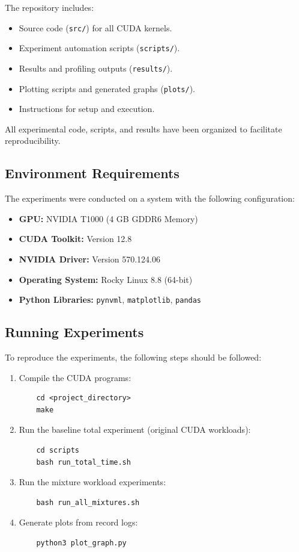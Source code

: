 \documentclass[sigconf,nonacm]{acmart}
\begin{document}
The repository includes:
\begin{itemize}
    \item Source code (\texttt{src/}) for all CUDA kernels.
    \item Experiment automation scripts (\texttt{scripts/}).
    \item Results and profiling outputs (\texttt{results/}).
    \item Plotting scripts and generated graphs (\texttt{plots/}).
    \item Instructions for setup and execution.
\end{itemize}


All experimental code, scripts, and results have been organized to facilitate reproducibility.

\subsection{Environment Requirements}
The experiments were conducted on a system with the following configuration:
\begin{itemize}
    \item \textbf{GPU:} NVIDIA T1000 (4 GB GDDR6 Memory)
    \item \textbf{CUDA Toolkit:} Version 12.8
    \item \textbf{NVIDIA Driver:} Version 570.124.06
    \item \textbf{Operating System:} Rocky Linux 8.8 (64-bit)
    \item \textbf{Python Libraries:} \texttt{pynvml}, \texttt{matplotlib}, \texttt{pandas}
\end{itemize}

\subsection{Running Experiments}
To reproduce the experiments, the following steps should be followed:

\begin{enumerate}
    \item Compile the CUDA programs:
\begin{verbatim} 
    cd <project_directory> 
    make 
    \end{verbatim}
    
    \item Run the baseline total experiment (original CUDA workloads):
    \begin{verbatim}
    cd scripts
    bash run_total_time.sh
    \end{verbatim}
    
    \item Run the mixture workload experiments:
    \begin{verbatim}
    bash run_all_mixtures.sh
    \end{verbatim}
    
    \item Generate plots from record logs:
    \begin{verbatim}
    python3 plot_graph.py
    \end{verbatim}
\end{enumerate}
\end{document}
